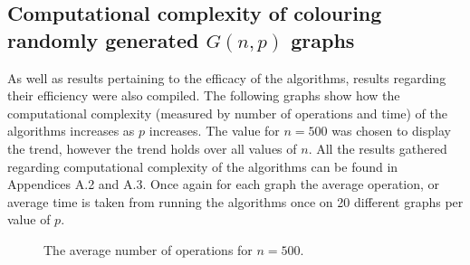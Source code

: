 \subsection{Computational complexity of colouring randomly generated $G(n, p)$ graphs}

As well as results pertaining to the efficacy of the algorithms, results regarding their efficiency were also compiled. The following graphs show how the computational complexity (measured by number of operations and time) of the algorithms increases as $p$ increases. The value for $n = 500$ was chosen to display the trend, however the trend holds over all values of $n$. All the results gathered regarding computational complexity of the algorithms can be found in Appendices A.2 and A.3. Once again for each graph the average operation, or average time is taken from running the algorithms once on 20 different graphs per value of $p$.

\begin{figure}[H]
    \centering

  \caption{The average number of operations for $n = 500$.}
    \label{fig:V500Ops}
\end{figure}  

